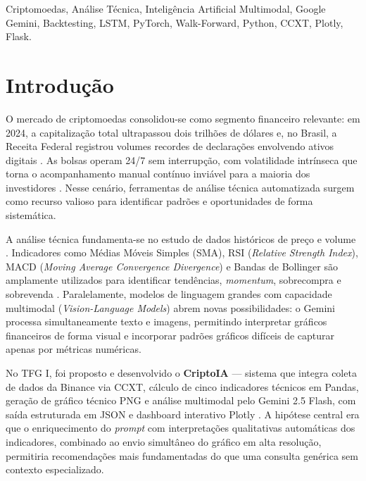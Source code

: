 \documentclass[conference]{IEEEtran}
\begin{document}
\begin{IEEEkeywords}
Criptomoedas, Análise Técnica, Inteligência Artificial Multimodal, Google Gemini, Backtesting, LSTM, PyTorch, Walk-Forward, Python, CCXT, Plotly, Flask.
\end{IEEEkeywords}

\section{Introdução}

O mercado de criptomoedas consolidou-se como segmento financeiro relevante: em 2024, a capitalização total ultrapassou dois trilhões de dólares e, no Brasil, a Receita Federal registrou volumes recordes de declarações envolvendo ativos digitais \cite{coinmarketcap2024,pinheiro2019mercado}. As bolsas operam 24/7 sem interrupção, com volatilidade intrínseca que torna o acompanhamento manual contínuo inviável para a maioria dos investidores \cite{assaf2012mercado}. Nesse cenário, ferramentas de análise técnica automatizada surgem como recurso valioso para identificar padrões e oportunidades de forma sistemática.

A análise técnica fundamenta-se no estudo de dados históricos de preço e volume \cite{murphy1999technical}. Indicadores como Médias Móveis Simples (SMA), RSI (\textit{Relative Strength Index}), MACD (\textit{Moving Average Convergence Divergence}) e Bandas de Bollinger são amplamente utilizados para identificar tendências, \textit{momentum}, sobrecompra e sobrevenda \cite{cavalcante2005mercado,wilder1978new,bollinger2001bollinger}. Paralelamente, modelos de linguagem grandes com capacidade multimodal (\textit{Vision-Language Models}) abrem novas possibilidades: o Gemini \cite{google2024gemini} processa simultaneamente texto e imagens, permitindo interpretar gráficos financeiros de forma visual e incorporar padrões gráficos difíceis de capturar apenas por métricas numéricas.

No TFG I, foi proposto e desenvolvido o \textbf{CriptoIA} — sistema que integra coleta de dados da Binance via CCXT, cálculo de cinco indicadores técnicos em Pandas, geração de gráfico técnico PNG e análise multimodal pelo Gemini 2.5 Flash, com saída estruturada em JSON e dashboard interativo Plotly \cite{tcc1}. A hipótese central era que o enriquecimento do \textit{prompt} com interpretações qualitativas automáticas dos indicadores, combinado ao envio simultâneo do gráfico em alta resolução, permitiria recomendações mais fundamentadas do que uma consulta genérica sem contexto especializado.
\end{document}
